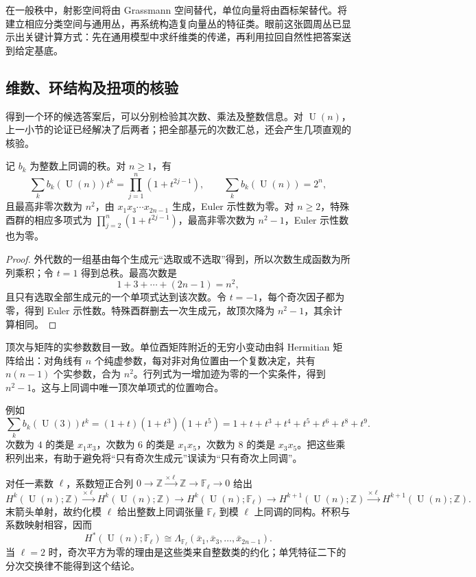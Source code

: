 在一般秩中，射影空间将由 Grassmann 空间替代，单位向量将由酉标架替代。将建立相应分类空间与通用丛，再系统构造复向量丛的特征类。眼前这张圆周丛已显示出关键计算方式：先在通用模型中求纤维类的传递，再利用拉回自然性把答案送到给定基底。

\subsection{维数、环结构及扭项的核验}
\label{g2:subsec:1104:03}

得到一个环的候选答案后，可以分别检验其次数、乘法及整数信息。对 \(\operatorname{U}(n)\)，上一小节的论证已经解决了后两者；把全部基元的次数汇总，还会产生几项直观的核验。

\begin{corollary}\label{g2:cor:unitary-betti-polynomial}
	记 \(b_k\) 为整数上同调的秩。对 \(n\ge1\)，有
	\[
		\sum_k b_k(\operatorname{U}(n))t^k=\prod_{j=1}^n(1+t^{2j-1}),
		\qquad \sum_k b_k(\operatorname{U}(n))=2^n,
	\]
	且最高非零次数为 \(n^2\)，由 \(x_1x_3\cdots x_{2n-1}\) 生成，Euler 示性数为零。对 \(n\ge2\)，特殊酉群的相应多项式为 \(\prod_{j=2}^n(1+t^{2j-1})\)，最高非零次数为 \(n^2-1\)，Euler 示性数也为零。
\end{corollary}
\begin{proof}
	外代数的一组基由每个生成元“选取或不选取”得到，所以次数生成函数为所列乘积；令 \(t=1\) 得到总秩。最高次数是
	\[
		1+3+\cdots+(2n-1)=n^2,
	\]
	且只有选取全部生成元的一个单项式达到该次数。令 \(t=-1\)，每个奇次因子都为零，得到 Euler 示性数。特殊酉群删去一次生成元，故顶次降为 \(n^2-1\)，其余计算相同。
\end{proof}

顶次与矩阵的实参数数目一致。单位酉矩阵附近的无穷小变动由斜 Hermitian 矩阵给出：对角线有 \(n\) 个纯虚参数，每对非对角位置由一个复数决定，共有 \(n(n-1)\) 个实参数，合为 \(n^2\)。行列式为一增加迹为零的一个实条件，得到 \(n^2-1\)。这与上同调中唯一顶次单项式的位置吻合。

\ProseParagraphBreak

例如
\[
	\sum_kb_k(\operatorname{U}(3))t^k=(1+t)(1+t^3)(1+t^5)
	=1+t+t^3+t^4+t^5+t^6+t^8+t^9.
\]
次数为 \(4\) 的类是 \(x_1x_3\)，次数为 \(6\) 的类是 \(x_1x_5\)，次数为 \(8\) 的类是 \(x_3x_5\)。把这些乘积列出来，有助于避免将“只有奇次生成元”误读为“只有奇次上同调”。

\ProseParagraphBreak

对任一素数 \(\ell\)，系数短正合列 \(0\rightarrow\mathbb Z\xrightarrow{\times\ell}\mathbb Z\rightarrow\mathbb F_\ell\rightarrow0\) 给出
\[
	H^k(\operatorname{U}(n);\mathbb Z)\xrightarrow{\times\ell}H^k(\operatorname{U}(n);\mathbb Z)
	\longrightarrow H^k(\operatorname{U}(n);\mathbb F_\ell)
	\longrightarrow H^{k+1}(\operatorname{U}(n);\mathbb Z)\xrightarrow{\times\ell}H^{k+1}(\operatorname{U}(n);\mathbb Z).
\]
末箭头单射，故约化模 \(\ell\) 给出整数上同调张量 \(\mathbb F_\ell\) 到模 \(\ell\) 上同调的同构。杯积与系数映射相容，因而
\[
	H^*(\operatorname{U}(n);\mathbb F_\ell)\cong\Lambda_{\mathbb F_\ell}(\bar x_1,\bar x_3,\ldots,\bar x_{2n-1}).
\]
当 \(\ell=2\) 时，奇次平方为零的理由是这些类来自整数类的约化；单凭特征二下的分次交换律不能得到这个结论。

